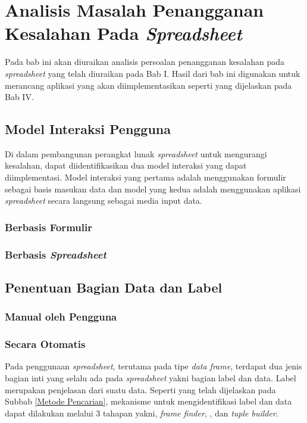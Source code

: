 \chapter{Analisis Masalah Penangganan Kesalahan Pada \textit{Spreadsheet}}
Pada bab ini akan diuraikan analisis persoalan penangganan kesalahan pada \textit{spreadsheet} yang telah diuraikan pada Bab I. Hasil dari bab ini digunakan untuk merancang aplikasi yang akan diimplementasikan seperti yang dijelaskan pada Bab IV.

\section{Model Interaksi Pengguna}
Di dalam pembangunan perangkat lunak \textit{spreadsheet} untuk mengurangi kesalahan, dapat diidentifikasikan dua model interaksi yang dapat diimplementasi. Model interaksi yang pertama adalah menggunakan formulir sebagai basis masukan data dan model yang kedua adalah menggunakan aplikasi \textit{spreadsheet} secara langsung sebagai media input data.

\subsection{Berbasis Formulir}


\subsection{Berbasis \textit{Spreadsheet}}

\section{}

\section{Penentuan Bagian Data dan Label}
\subsection{Manual oleh Pengguna}

\subsection{Secara Otomatis}
Pada penggunaan \textit{spreadsheet}, terutama pada tipe \textit{data frame}, terdapat dua jenis bagian inti yang selalu ada pada \textit{spreadsheet} yakni bagian label dan data. Label merupakan penjelasan dari suatu data. Seperti yang telah dijelaskan pada Subbab \ref{Metode Pencarian}, mekanisme untuk mengidentifikasi label dan data dapat dilakukan melalui 3 tahapan yakni, \textit{frame finder}, , dan \textit{tuple builder}.

